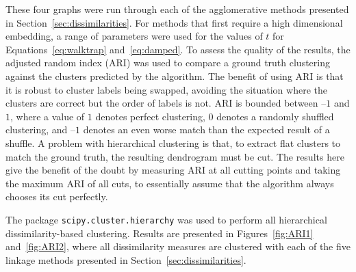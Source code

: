 These four graphs were run through each of the agglomerative methods presented in Section~\ref{sec:dissimilarities}. For methods that first require a high dimensional embedding, a range of parameters were used for the values of $t$ for Equations~\eqref{eq:walktrap} and~\eqref{eq:damped}.
To assess the quality of the results, the adjusted random index (ARI) was used to compare a ground truth clustering against the clusters predicted by the algorithm. The benefit of using ARI is that it is robust to cluster labels being swapped, avoiding the situation where the clusters are correct but the order of labels is not.
ARI is bounded between --$1$ and $1$, where a value of $1$ denotes perfect clustering, $0$ denotes a randomly shuffled clustering, and --$1$ denotes an even worse match than the expected result of a shuffle.
A problem with hierarchical clustering is that, to extract flat clusters to match the ground truth, the resulting dendrogram must be cut. The results here give the benefit of the doubt by measuring ARI at all cutting points and taking the maximum ARI of all cuts, to essentially assume that the algorithm always chooses its cut perfectly.

The package \texttt{scipy.cluster.hierarchy} \cite{Virtanen2020} was used to perform all hierarchical dissimilarity-based clustering.
Results are presented in Figures~\ref{fig:ARI1} and~\ref{fig:ARI2}, where all dissimilarity measures are clustered with each of the five linkage methods presented in Section~\ref{sec:dissimilarities}.

